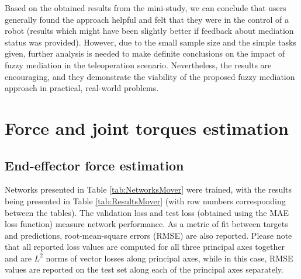 Based on the obtained results from the mini-study, we can conclude that users generally found the approach helpful and felt that they were in the control of a robot (results which might have been slightly better if feedback about mediation status was provided). However, due to the small sample size and the simple tasks given, further analysis is needed to make definite conclusions on the impact of fuzzy mediation in the teleoperation scenario. Nevertheless, the results are encouraging, and they demonstrate the viability of the proposed fuzzy mediation approach in practical, real-world problems.

\section{Force and joint torques estimation}

\subsection{End-effector force estimation}

Networks presented in Table \ref{tab:NetworksMover} were trained, with the results being presented in Table \ref{tab:ResultsMover} (with row numbers corresponding between the tables). The validation loss and test loss (obtained using the MAE loss function) measure network performance.  As a metric of fit between targets and predictions, root-mean-square errors (RMSE) are also reported. Please note that all reported loss values are computed for all three principal axes together and are $L^2$ norms of vector losses along principal axes, while in this case, RMSE values are reported on the test set along each of the principal axes separately.

